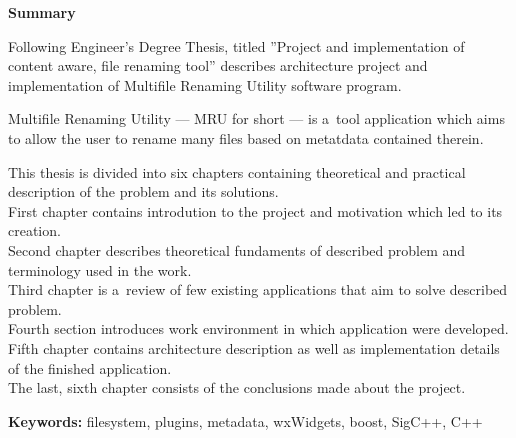 \clearpage

\begin{center}
\textbf{Summary}
\end{center}

\par
Following Engineer's Degree Thesis, titled ''Project and implementation of content aware, file renaming tool'' describes architecture project and implementation of Multifile Renaming Utility software program.

\par
Multifile Renaming Utility --- MRU for short --- is a~tool application which aims to allow the user to rename many files based on metatdata contained therein.

\par
This thesis is divided into six chapters containing theoretical and practical description of the problem and its solutions.\\
First chapter contains introdution to the project and motivation which led to its creation.\\
Second chapter describes theoretical fundaments of described problem and terminology used in the work.\\
Third chapter is a~review of few existing applications that aim to solve described problem.\\
Fourth section introduces work environment in which application were developed.\\
Fifth chapter contains architecture description as well as implementation details of the finished application.\\
The last, sixth chapter consists of the conclusions made ​​about the project.

\vspace*{\baselineskip}

\noindent\textbf{Keywords:} filesystem, plugins, metadata, wxWidgets, boost, SigC++, C++
